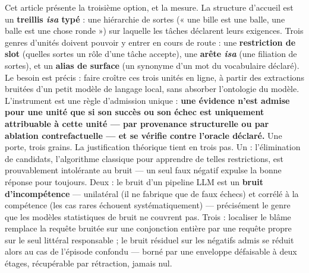 \documentclass[11pt]{article}
\begin{document}
Cet article présente la troisième option, et la mesure. La structure d'accueil est un \textbf{treillis \emph{isa} typé} : une hiérarchie de sortes (« une bille est une balle, une balle est une chose ronde ») sur laquelle les tâches déclarent leurs exigences. Trois genres d'unités doivent pouvoir y entrer en cours de route : une \textbf{restriction de slot} (quelles sortes un rôle d'une tâche accepte), une \textbf{arête \emph{isa}} (une filiation de sortes), et un \textbf{alias de surface} (un synonyme d'un mot du vocabulaire déclaré). Le besoin est précis : faire croître ces trois unités en ligne, à partir des extractions bruitées d'un petit modèle de langage local, sans absorber l'ontologie du modèle. L'instrument est une règle d'admission unique : \textbf{une évidence n'est admise pour une unité que si son succès ou son échec est uniquement attribuable à cette unité — par provenance structurelle ou par ablation contrefactuelle — et se vérifie contre l'oracle déclaré.} Une porte, trois grains. La justification théorique tient en trois pas. Un : l'élimination de candidats, l'algorithme classique pour apprendre de telles restrictions, est prouvablement intolérante au bruit — un seul faux négatif expulse la bonne réponse pour toujours. Deux : le bruit d'un pipeline LLM est un \textbf{bruit d'incompétence} — unilatéral (il ne fabrique que de faux échecs) et corrélé à la compétence (les cas rares échouent systématiquement) — précisément le genre que les modèles statistiques de bruit ne couvrent pas. Trois : localiser le blâme remplace la requête bruitée sur une conjonction entière par une requête propre sur le seul littéral responsable ; le bruit résiduel sur les négatifs admis se réduit alors au cas de l'épisode confondu — borné par une enveloppe défaisable à deux étages, récupérable par rétraction, jamais nul.
\end{document}

